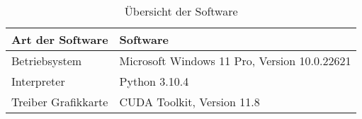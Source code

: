 \begin{table}[!htb]
\centering
\begin{tabular}{|l|l|}
\hline
\rowcolor[HTML]{CBCEFB} 
{\color[HTML]{000000} Art der Software} & {\color[HTML]{000000} Software}              \\ \hline
Betriebsystem                           & Microsoft Windows 11 Pro, Version 10.0.22621 \\ \hline
Interpreter                             & Python 3.10.4                                \\ \hline
Treiber Grafikkarte                     & CUDA Toolkit, Version 11.8                   \\ \hline
\end{tabular}
\caption{Übersicht der Software}
\label{tab:software}
\end{table}